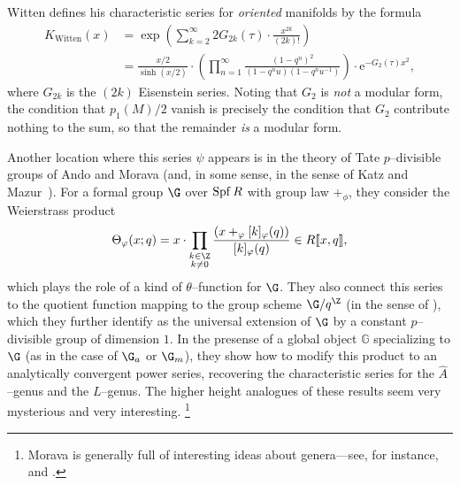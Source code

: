 \begin{remark}\label{WittenCharSeries}
Witten defines his characteristic series for \emph{oriented} manifolds by the formula
\begin{align*}
K_{\mathrm{Witten}}(x) & = \exp\left( \sum_{k=2}^\infty 2 G_{2k}(\tau) \cdot \frac{x^{2k}}{(2k)!} \right) \\
& = \frac{x/2}{\sinh(x/2)} \cdot \left(\prod_{n=1}^\infty \frac{(1 - q^n)^2}{(1 - q^n u)(1 - q^n u^{-1})}\right) \cdot \mathrm e^{-G_2(\tau) x^2},
\end{align*}
where \(G_{2k}\) is the \((2k)\){\th} Eisenstein series.
Noting that \(G_2\) is \emph{not} a modular form, the condition that \(p_1(M) / 2\) vanish is precisely the condition that \(G_2\) contribute nothing to the sum, so that the remainder \emph{is} a modular form.
\end{remark}

\begin{remark}
Another location where this series \(\psi\) appears is in the theory of Tate \(p\)--divisible groups of Ando and Morava (and, in some sense, in the sense of Katz and Mazur~\cite[Sections 8.7--8]{KatzMazur}).
For a formal group \(\G\) over \(\operatorname{Spf} R\) with group law \(+_\phi\), they consider the Weierstrass product \[\Theta_{\phi}(x; q) = x \cdot \prod_{\substack{k \in \Z \\ k \ne 0}} \frac{(x +_\phi [k]_\phi(q))}{[k]_\phi(q)} \in R\ps{x,q},\] which plays the role of a kind of \(\theta\)--function for \(\G\).
They also connect this series to the quotient function mapping to the group scheme \(\G / q^{\Z}\) (in the sense of ), which they further identify as the universal extension of \(\G\) by a constant \(p\)--divisible group of dimension \(1\).
In the presense of a global object \(\mathbb G\) specializing to \(\G\) (as in the case of \(\G_a\) or \(\G_m\)), they show how to modify this product to an analytically convergent power series, recovering the characteristic series for the \(\widehat A\)--genus and the \(L\)--genus.
The higher height analogues of these results seem very mysterious and very interesting.%
\footnote{%
Morava is generally full of interesting ideas about genera---see, for instance,~\cite{MoravaMotivicThomIso} and \cite{MoravaTHH}.
}
\end{remark}

